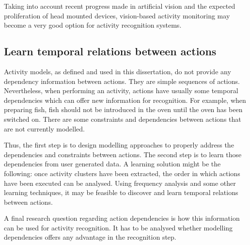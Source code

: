 Taking into account recent progress made in artificial vision and the expected proliferation of head mounted devices, vision-based activity monitoring may become a very good option for activity recognition systems.

\subsection{Learn temporal relations between actions}

Activity models, as defined and used in this dissertation, do not provide any dependency information between actions. They are simple sequences of actions. Nevertheless, when performing an activity, actions have usually some temporal dependencies which can offer new information for recognition. For example, when preparing fish, fish should not be introduced in the oven until the oven has been switched on. There are some constraints and dependencies between actions that are not currently modelled.

Thus, the first step is to design modelling approaches to properly address the dependencies and constraints between actions. The second step is to learn those dependencies from user generated data. A learning solution might be the following: once activity clusters have been extracted, the order in which actions have been executed can be analysed. Using frequency analysis and some other learning techniques, it may be feasible to discover and learn temporal relations between actions. 

A final research question regarding action dependencies is how this information can be used for activity recognition. It has to be analysed whether modelling dependencies offers any advantage in the recognition step.
